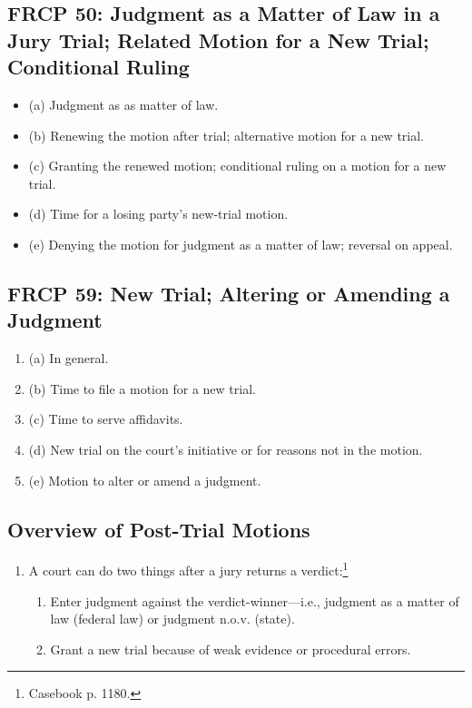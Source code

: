 \subsection{FRCP 50: Judgment as a Matter of Law in a Jury Trial; Related Motion for a New Trial; Conditional Ruling}

\begin{itemize}
    \item (a) Judgment as as matter of law.
    \item (b) Renewing the motion after trial; alternative motion for a new trial.
    \item (c) Granting the renewed motion; conditional ruling on a motion for a new trial.
    \item (d) Time for a losing party's new-trial motion.
    \item (e) Denying the motion for judgment as a matter of law; reversal on appeal.
\end{itemize}

\subsection{FRCP 59: New Trial; Altering or Amending a Judgment}

\begin{enumerate}
    \item (a) In general.
    \item (b) Time to file a motion for a new trial.
    \item (c) Time to serve affidavits.
    \item (d) New trial on the court's initiative or for reasons not in the motion.
    \item (e) Motion to alter or amend a judgment.
\end{enumerate}

\subsection{Overview of Post-Trial Motions}

\begin{enumerate}
    \item A court can do two things after a jury returns a verdict:\footnote{Casebook p. 1180.}
    \begin{enumerate}
        \item Enter judgment against the verdict-winner---i.e., judgment as a matter of law (federal law) or judgment n.o.v. (state).
        \item Grant a new trial because of weak evidence or procedural errors.
    \end{enumerate}
\end{enumerate}

